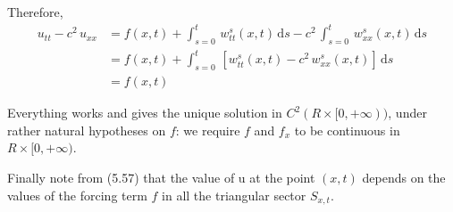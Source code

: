 \documentclass[../main.tex]{subfiles}
\begin{document}
Therefore,
\begin{align}
    u_{tt} - c^2 \, u_{xx} &= f(x,t) + \int_{s = 0}^{t} \,  w_{tt}^s(x,t) \, \mathrm{d} s - c^2 \, \int_{s = 0}^{t} \,  w_{xx}^s(x,t) \, \mathrm{d} s \\
    &= f(x,t) + \int_{s = 0}^{t} \, [w_{tt}^s(x,t) - c^2 \, w_{xx}^s(x,t)] \, \mathrm{d} s \\
    &= f(x,t)
\end{align}

Everything works and gives the unique solution in $C^2(R \times [0, + \infty))$, under rather natural hypotheses on $f$: we require $f$ and $f_x$ to be continuous in $R \times [0, + \infty)$.

Finally note from (5.57) that the value of u at the point $(x,t)$ depends on the values of the forcing term $f$ in all the triangular sector $S_{x,t}$.
\end{document}

